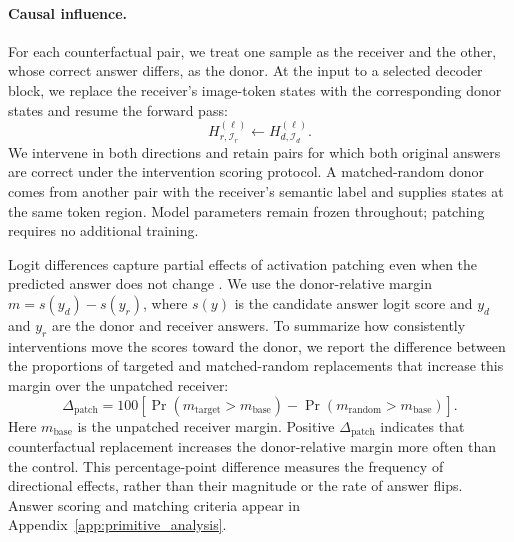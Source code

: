 \documentclass{article} %
\begin{document}
\paragraph{Causal influence.}
For each counterfactual pair, we treat one sample as the receiver and the other, whose correct answer differs, as the donor. At the input to a selected decoder block, we replace the receiver's image-token states with the corresponding donor states and resume the forward pass:
\begin{equation}
    H_{r,\mathcal I_r}^{(\ell)}\leftarrow H_{d,\mathcal I_d}^{(\ell)}.
\end{equation}
We intervene in both directions and retain pairs for which both original answers are correct under the intervention scoring protocol. A matched-random donor comes from another pair with the receiver's semantic label and supplies states at the same token region. Model parameters remain frozen throughout; patching requires no additional training.

Logit differences capture partial effects of activation patching even when the predicted answer does not change \citep{heimersheim2024activation}. We use the donor-relative margin $m=s(y_d)-s(y_r)$, where $s(y)$ is the candidate answer logit score and $y_d$ and $y_r$ are the donor and receiver answers. To summarize how consistently interventions move the scores toward the donor, we report the difference between the proportions of targeted and matched-random replacements that increase this margin over the unpatched receiver:
\begin{equation}
    \Delta_{\mathrm{patch}}=100\left[
    \Pr(m_{\mathrm{target}}>m_{\mathrm{base}})
    -\Pr(m_{\mathrm{random}}>m_{\mathrm{base}})
    \right].
\end{equation}
Here $m_{\mathrm{base}}$ is the unpatched receiver margin. Positive $\Delta_{\mathrm{patch}}$ indicates that counterfactual replacement increases the donor-relative margin more often than the control. This percentage-point difference measures the frequency of directional effects, rather than their magnitude or the rate of answer flips. Answer scoring and matching criteria appear in Appendix~\ref{app:primitive_analysis}.
\end{document}
